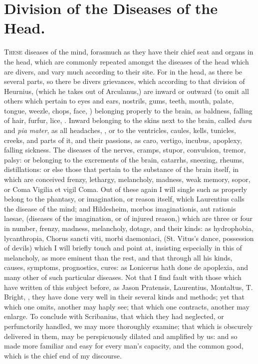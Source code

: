 {\section{Division of the Diseases of the Head.}

\lettrine{T}{hese} diseases of the mind, forasmuch as they have their chief seat and
organs in the head, which are commonly repeated amongst the diseases of
the head which are divers, and vary much according to their site. For
in the head, as there be several parts, so there be divers grievances,
which according to that division of Heurnius, (which he takes out
of Arculanus,) are inward or outward (to omit all others which pertain
to eyes and ears, nostrils, gums, teeth, mouth, palate, tongue, weezle,
chops, face, \etc{}) belonging properly to the brain, as baldness, falling
of hair, furfur, lice, \etc{}. Inward belonging to the skins next to
the brain, called \emph{dura} and \emph{pia mater}, as all headaches, \etc{}, or to
the ventricles, caules, kells, tunicles, creeks, and parts of it, and
their passions, as caro, vertigo, incubus, apoplexy, falling sickness.
The diseases of the nerves, cramps, stupor, convulsion, tremor, palsy:
or belonging to the excrements of the brain, catarrhs, sneezing,
rheums, distillations: or else those that pertain to the substance of
the brain itself, in which are conceived frenzy, lethargy, melancholy,
madness, weak memory, sopor, or Coma Vigilia et vigil Coma. Out of
these again I will single such as properly belong to the phantasy, or
imagination, or reason itself, which Laurentius calls the disease
of the mind; and Hildesheim, morbos imaginationis, aut rationis laesae,
(diseases of the imagination, or of injured reason,) which are three or
four in number, frenzy, madness, melancholy, dotage, and their kinds:
as hydrophobia, lycanthropia, Chorus sancti viti, morbi daemoniaci,
(St. Vitus's dance, possession of devils) which I will briefly touch
and point at, insisting especially in this of melancholy, as more
eminent than the rest, and that through all his kinds, causes,
symptoms, prognostics, cures: as Lonicerus hath done de apoplexia, and
many other of such particular diseases. Not that I find fault with
those which have written of this subject before, as Jason Pratensis,
Laurentius, Montaltus, T. Bright, \etc{}, they have done very well in
their several kinds and methods; yet that which one omits, another may
haply see; that which one contracts, another may enlarge. To conclude
with Scribanius, that which they had neglected, or perfunctorily
handled, we may more thoroughly examine; that which is obscurely
delivered in them, may be perspicuously dilated and amplified by us:
and so made more familiar and easy for every man's capacity, and the
common good, which is the chief end of my discourse.

}
